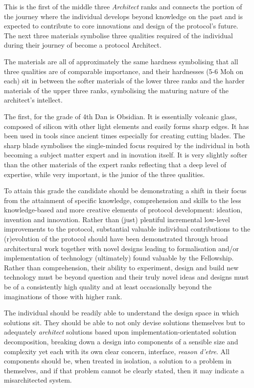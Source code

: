 \documentclass[9pt,oneside]{amsart}
\begin{document}
This is the first of the middle three \emph{Architect} ranks and connects the portion of the journey where the individual develops beyond knowledge on the past and is expected to contribute to core innovations and design of the protocol's future. The next three materials symbolise three qualities required of the individual during their journey of become a protocol Architect.

The materials are all of approximately the same hardness symbolising that all three qualities are of comparable importance, and their hardnesses (5-6 Moh on each) sit in between the softer materials of the lower three ranks and the harder materials of the upper three ranks, symbolising the maturing nature of the architect's intellect.

The first, for the grade of 4th Dan is Obsidian. It is essentially volcanic glass, composed of silicon with other light elements and easily forms sharp edges. It has been used in tools since ancient times especially for creating cutting blades. The sharp blade symbolises the single-minded focus required by the individual in both becoming a subject matter expert and in inovation itself. It is very slightly softer than the other materials of the expert ranks reflecting that a deep level of expertise, while very important, is the junior of the three qualities.

To attain this grade the candidate should be demonstrating a shift in their focus from the attainment of specific knowledge, comprehension and skills to the less knowledge-based and more creative elements of protocol development: ideation, invention and innovation. Rather than (just) plentiful incremental low-level improvements to the protocol, substantial valuable individual contributions to the (r)evolution of the protocol should have been demonstrated through broad architectural work together with novel designs leading to formalisation and/or implementation of technology (ultimately) found valuable by the Fellowship. Rather than comprehension, their ability to experiment, design and build new technology must be beyond question and their truly novel ideas and designs must be of a consistently high quality and at least occasionally beyond the imaginations of those with higher rank.

The individual should be readily able to understand the design space in which solutions sit. They should be able to not only devise solutions themselves but to adequately \textit{architect} solutions based upon implementation-orientated solution decomposition, breaking down a design into components of a sensible size and complexity yet each with its own clear concern, interface, \textit{reason d'etre}. All components should be, when treated in isolation, a solution to a problem in themselves, and if that problem cannot be clearly stated, then it may indicate a misarchitected system.
\end{document}
